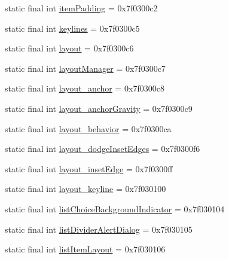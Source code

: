 \begin{DoxyCompactItemize}
\item 
static final int \mbox{\hyperlink{classcom_1_1synnapps_1_1carouselview_1_1_r_1_1attr_ae29802c5972125140a0a7166fe07a9f3}{item\+Padding}} = 0x7f0300c2
\item 
static final int \mbox{\hyperlink{classcom_1_1synnapps_1_1carouselview_1_1_r_1_1attr_ae63e542ab1f9946ea326018a02a5bc23}{keylines}} = 0x7f0300c5
\item 
static final int \mbox{\hyperlink{classcom_1_1synnapps_1_1carouselview_1_1_r_1_1attr_a1d296b66e35e5d615356ed06c490bbf5}{layout}} = 0x7f0300c6
\item 
static final int \mbox{\hyperlink{classcom_1_1synnapps_1_1carouselview_1_1_r_1_1attr_aa035c1045ecdef50790c9db9cc0a00f6}{layout\+Manager}} = 0x7f0300c7
\item 
static final int \mbox{\hyperlink{classcom_1_1synnapps_1_1carouselview_1_1_r_1_1attr_a2715687937044c561d98f93ce6d275aa}{layout\+\_\+anchor}} = 0x7f0300c8
\item 
static final int \mbox{\hyperlink{classcom_1_1synnapps_1_1carouselview_1_1_r_1_1attr_ad322d31b75973ae5a24b0fc8a577dc97}{layout\+\_\+anchor\+Gravity}} = 0x7f0300c9
\item 
static final int \mbox{\hyperlink{classcom_1_1synnapps_1_1carouselview_1_1_r_1_1attr_aca652985d1c8c2094114701f7f195715}{layout\+\_\+behavior}} = 0x7f0300ca
\item 
static final int \mbox{\hyperlink{classcom_1_1synnapps_1_1carouselview_1_1_r_1_1attr_a7aba49e9fd23b8305cdf36e1cd8c521e}{layout\+\_\+dodge\+Inset\+Edges}} = 0x7f0300f6
\item 
static final int \mbox{\hyperlink{classcom_1_1synnapps_1_1carouselview_1_1_r_1_1attr_a1d04e79df47a7d442b17700617a3bc5f}{layout\+\_\+inset\+Edge}} = 0x7f0300ff
\item 
static final int \mbox{\hyperlink{classcom_1_1synnapps_1_1carouselview_1_1_r_1_1attr_a1567bbce5177a34cb19f0d857e86efa7}{layout\+\_\+keyline}} = 0x7f030100
\item 
static final int \mbox{\hyperlink{classcom_1_1synnapps_1_1carouselview_1_1_r_1_1attr_aef3e9625a505e23f0107072f632c63cb}{list\+Choice\+Background\+Indicator}} = 0x7f030104
\item 
static final int \mbox{\hyperlink{classcom_1_1synnapps_1_1carouselview_1_1_r_1_1attr_abce2cf255e1b5405d8f3e3267605e2fc}{list\+Divider\+Alert\+Dialog}} = 0x7f030105
\item 
static final int \mbox{\hyperlink{classcom_1_1synnapps_1_1carouselview_1_1_r_1_1attr_a7a37ed8c6cc7977ed32a883352d673cf}{list\+Item\+Layout}} = 0x7f030106

\end{DoxyCompactItemize}
